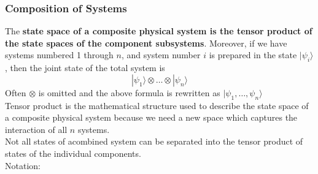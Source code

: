 \documentclass[10pt]{report}
\begin{document}
\subsubsection{Composition of Systems}
The \textbf{state space of a composite physical system is the tensor product of the state spaces of the component subsystems}. Moreover, if we have systems numbered 1 through $n$, and system number $i$ is prepared in the state $|\psi_i\rangle$, then the joint state of the total system is
$$|\psi_1\rangle\otimes\ldots\otimes|\psi_n\rangle$$
Often $\otimes$ is omitted and the above formula is rewritten as $|\psi_1,\ldots,\psi_n\rangle$\\
Tensor product is the mathematical structure used to describe the state space of a composite physical system because we need a new space which captures the interaction of all $n$ systems.\\
Not all states of acombined system can be separated into the tensor product of states of the individual components.\\
Notation:
\end{document}
